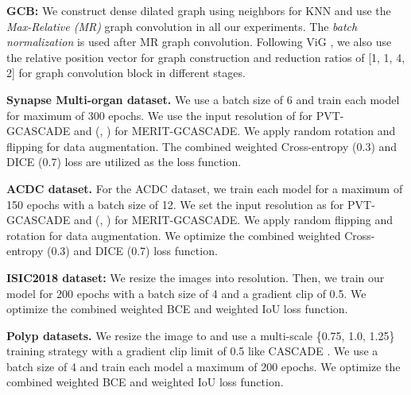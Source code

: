 \documentclass[10pt,twocolumn,letterpaper]{article}
\begin{document}
\textbf{GCB:} We construct dense dilated graph using  neighbors for KNN and use the \textit{Max-Relative (MR)} graph convolution in all our experiments. The \textit{batch normalization} is used after MR graph convolution. Following ViG \cite{han2022vision}, we also use the relative position vector for graph construction and reduction ratios of [1, 1, 4, 2] for graph convolution block in different stages.   

\textbf{Synapse Multi-organ dataset.}
We use a batch size of 6 and train each model for maximum of 300 epochs. We use the input resolution of  for PVT-GCASCADE and (, ) for MERIT-GCASCADE. We apply random rotation and flipping for data augmentation. The combined weighted Cross-entropy (0.3) and DICE (0.7) loss are utilized as the loss function.

\textbf{ACDC dataset.}
For the ACDC dataset, we train each model for a maximum of 150 epochs with a batch size of 12. We set the input resolution as  for PVT-GCASCADE and (, ) for MERIT-GCASCADE. We apply random flipping and rotation for data augmentation. We optimize the combined weighted Cross-entropy (0.3) and DICE (0.7) loss function.

\textbf{ISIC2018 dataset:} We resize the images into  resolution. Then, we train our model for 200 epochs with a batch size of 4 and a gradient clip of 0.5. We optimize the combined weighted BCE and weighted IoU loss function.

\textbf{Polyp datasets.}
We resize the image to  and use a multi-scale \{0.75, 1.0, 1.25\} training strategy with a gradient clip limit of 0.5 like CASCADE \cite{Rahman_2023_WACV}. We use a batch size of 4 and train each model a maximum of 200 epochs. We optimize the combined weighted BCE and weighted IoU loss function.
\end{document}
